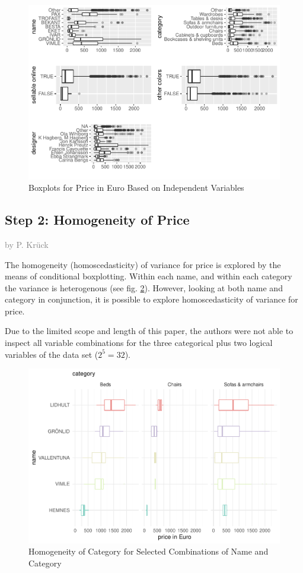 \documentclass[a4paper, nobind]{templates/ociamthesis}
\begin{document}
\begin{figure}
\includegraphics[width=1\linewidth]{_main_files/figure-latex/outliers-1} \caption{Boxplots for Price in Euro Based on Independent Variables}\label{fig:outliers}
\end{figure}

\hypertarget{step-2-homogeneity-of-price}{%
\subsection{Step 2: Homogeneity of Price}\label{step-2-homogeneity-of-price}}

\textcolor{gray}{by P. Krück}

The homogeneity (homoscedasticity) of variance for price is explored by the means of conditional boxplotting.
Within each name, and within each category the variance is heterogenous (see fig. \ref{fig:homogeneity}). However, looking at both name and category in conjunction, it is possible to explore homoscedasticity of variance for price.

Due to the limited scope and length of this paper, the authors were not able to inspect all variable combinations for the three categorical plus two logical variables of the data set (\(2^5=32\)).

\begin{figure}
\includegraphics[width=1\linewidth]{_main_files/figure-latex/homogeneity-1} \caption{Homogeneity of Category for Selected Combinations of Name and Category}\label{fig:homogeneity}
\end{figure}
\end{document}
